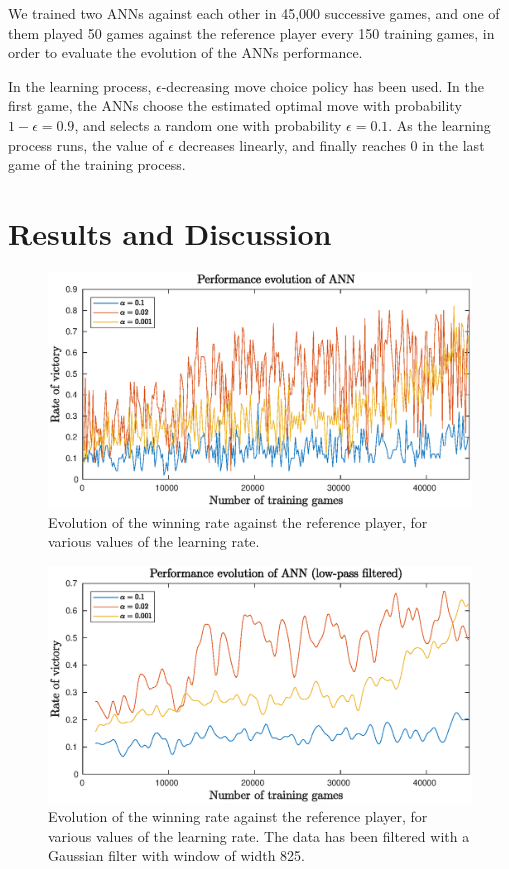 \documentclass[a4paper, 9pt, twoside, twocolumn]{article}
\begin{document}
We trained two ANNs against each other in 45,000 successive games, and one of them
played 50 games against the reference player every 150 training games, in order
to evaluate the evolution of the ANNs performance.

In the learning process, $\epsilon$-decreasing move choice policy
\cite{Scott2010} has been used. In the first game, the ANNs choose the estimated
optimal move with probability $1-\epsilon=0.9$, and selects a random one with
probability $\epsilon=0.1$. As the learning process runs, the value of
$\epsilon$ decreases linearly, and finally reaches $0$ in the last game of the
training process.

\section{Results and Discussion}
\label{sec:results}
\begin{figure}
    \centering
    \includegraphics[width=\linewidth]{final_not_smoothed}
    \caption{Evolution of the winning rate against the reference player, for
    various values of the learning rate.}
    \label{non_filtered}
\end{figure}
\begin{figure}
    \centering
    \includegraphics[width=\linewidth]{final_smoothed}
    \caption{Evolution of the winning rate against the reference player, for various
    values of the learning rate. The data
    has been filtered with a Gaussian filter with window of width 825.}
    \label{filtered}
\end{figure}
\end{document}
